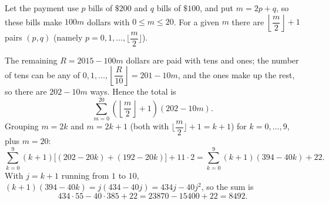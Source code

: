Let the payment use $p$ bills of $\$200$ and $q$ bills of $\$100$, and put $m=2p+q$, so these bills make $100m$ dollars with $0\le m\le20$. For a given $m$ there are $\left\lfloor\dfrac {m}{2}\right\rfloor+1$ pairs $(p,q)$ (namely $p=0,1,\dots,\lfloor\dfrac {m}{2}\rfloor$).

The remaining $R=2015-100m$ dollars are paid with tens and ones; the number of tens can be any of $0,1,\dots,\left\lfloor\dfrac {R}{10}\right\rfloor=201-10m$, and the ones make up the rest, so there are $202-10m$ ways. Hence the total is
\[
\sum_{m=0}^{20}\left(\left\lfloor\dfrac {m}{2}\right\rfloor+1\right)(202-10m).
\]
Grouping $m=2k$ and $m=2k+1$ (both with $\lfloor\dfrac {m}{2}\rfloor+1=k+1$) for $k=0,\dots,9$, plus $m=20$:
\[
\sum_{k=0}^{9}(k+1)\bigl[(202-20k)+(192-20k)\bigr]+11\cdot2=\sum_{k=0}^{9}(k+1)(394-40k)+22 .
\]
With $j=k+1$ running from $1$ to $10$, $(k+1)(394-40k)=j(434-40j)=434j-40j^2$, so the sum is
\[
434\cdot55-40\cdot385+22=23870-15400+22=\boxed{8492}.
\]
